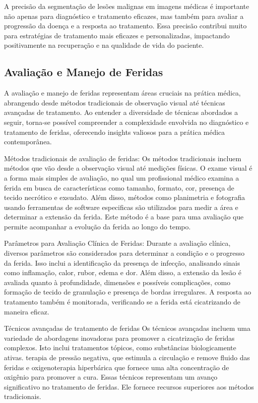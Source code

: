 A precisão da segmentação de lesões malignas em imagens médicas é importante não apenas para diagnóstico e tratamento eficazes, mas também para avaliar a progressão da doença e a resposta ao tratamento. Essa precisão contribui muito para estratégias de tratamento mais eficazes e personalizadas, impactando positivamente na recuperação e na qualidade de vida do paciente.

\subsection{Avaliação e Manejo de Feridas}

A avaliação e manejo de feridas representam áreas cruciais na prática médica, abrangendo desde métodos tradicionais de observação visual até técnicas avançadas de tratamento. Ao entender a diversidade de técnicas abordados a seguir, torna-se possível compreender a complexidade envolvida no diagnóstico e tratamento de feridas, oferecendo insights valiosos para a prática médica contemporânea.

Métodos tradicionais de avaliação de feridas: Os métodos tradicionais incluem métodos que vão desde a observação visual até medições físicas. O exame visual é a forma mais simples de avaliação, no qual um profissional médico examina a ferida em busca de  características como tamanho, formato, cor, presença de tecido necrótico e exsudato. Além disso, métodos como planimetria e fotografia usando ferramentas de software especificas são utilizados para medir a área e determinar a extensão da ferida. Este método é a base para uma avaliação que permite acompanhar a evolução da ferida ao longo do tempo.

Parâmetros para Avaliação Clínica de Feridas: Durante a avaliação clínica, diversos parâmetros são considerados para determinar a condição e o progresso da ferida. Isso inclui a identificação da presença de infecção, analisando sinais como inflamação, calor, rubor, edema e dor. Além disso, a extensão da lesão é avaliada quanto à profundidade, dimensões e possíveis complicações, como formação de tecido de granulação e presença de bordas irregulares. A resposta ao tratamento também é monitorada, verificando se a ferida está cicatrizando de maneira eficaz.

Técnicos avançadas de tratamento de feridas Os técnicos avançadas incluem uma variedade de abordagens inovadoras para promover a cicatrização de feridas complexos. Isto inclui tratamentos tópicos, como substâncias biologicamente ativas. terapia de pressão negativa, que estimula a circulação e remove fluido das feridas e oxigenoterapia hiperbárica que fornece uma alta concentração de oxigênio para promover a cura. Essas técnicos representam um avanço significativo no tratamento de feridas. Ele fornece recursos superiores aos métodos tradicionais.

